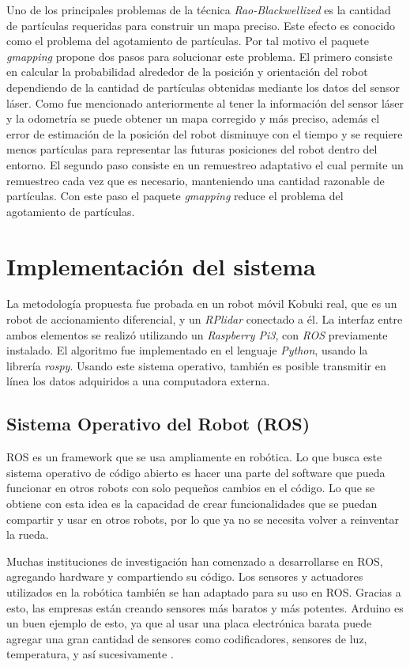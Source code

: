 Uno de los principales problemas de la técnica \textit{Rao-Blackwellized} es la cantidad 
de partículas requeridas para construir un mapa preciso. Este efecto es conocido como el 
problema del agotamiento de partículas. Por tal motivo el paquete \textit{gmapping} propone 
dos pasos para solucionar este problema. El primero consiste en calcular la probabilidad 
alrededor de la posición y orientación del robot dependiendo de la cantidad de partículas 
obtenidas mediante los datos del sensor láser. Como fue mencionado anteriormente al tener 
la información del sensor láser y la odometría se puede obtener un mapa corregido y más 
preciso, además el error de estimación de la posición del robot disminuye con el tiempo y 
se requiere menos partículas para representar las futuras posiciones del robot dentro del 
entorno. El segundo paso consiste en un remuestreo adaptativo el cual permite un remuestreo 
cada vez que es necesario, manteniendo una cantidad razonable de partículas. Con este paso 
el paquete \textit{gmapping} reduce el problema del agotamiento de partículas.


\section{Implementaci\'on del sistema}

La metodología propuesta fue probada en un robot móvil Kobuki real, que es un robot de 
accionamiento diferencial, y un \textit{RPlidar} conectado a él. La interfaz entre ambos elementos 
se realizó utilizando un \textit{Raspberry Pi3}, con \textit{ROS} previamente instalado.
El algoritmo fue implementado en el lenguaje \textit{Python}, usando la librería 
\textit{rospy}. Usando este sistema operativo, también es posible transmitir en línea los 
datos adquiridos a una computadora externa. 

\subsection{Sistema Operativo del Robot (ROS)}
ROS es un framework que se usa ampliamente en rob\'otica. Lo que busca este sistema 
operativo de código abierto es hacer una parte del software que pueda funcionar en 
otros robots con solo pequeños cambios en el código. Lo que se obtiene con esta idea 
es la capacidad de crear funcionalidades que se puedan compartir y usar en otros robots, por 
lo que ya no se necesita volver a reinventar la rueda.

Muchas instituciones de investigaci\'on han comenzado a desarrollarse en 
ROS, agregando hardware y compartiendo su c\'odigo. Los sensores y actuadores 
utilizados en la rob\'otica tambi\'en se han adaptado para su uso en ROS. Gracias 
a esto, las empresas est\'an creando sensores m\'as baratos y m\'as potentes. Arduino 
es un buen ejemplo de esto, ya que al usar una placa electr\'onica barata puede 
agregar una gran cantidad de sensores como codificadores, sensores de luz, 
temperatura, y as\'i sucesivamente \cite{rosIntroduction}.

